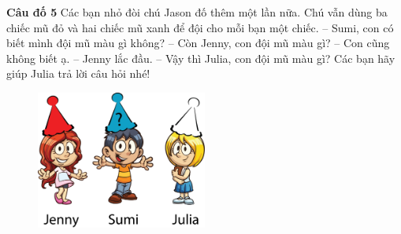 	\textbf{Câu đố 5}
	\vskip 0.1cm
	Các bạn nhỏ đòi chú Jason đố thêm một lần nữa. Chú vẫn dùng ba chiếc mũ đỏ và hai chiếc mũ xanh để đội cho mỗi bạn một chiếc.
	\vskip 0.1cm
	-- Sumi, con có biết mình đội mũ màu gì không?
	\vskip 0.1cm
	-- Còn Jenny, con đội mũ màu gì?
	\vskip 0.1cm
	-- Con cũng không biết ạ. -- Jenny lắc đầu.
	\vskip 0.1cm
	-- Vậy thì Julia, con đội mũ màu gì?
	\vskip 0.1cm
	Các bạn hãy giúp Julia trả lời câu hỏi nhé!
	\begin{figure}[H]
		\centering
		\vspace*{-5pt}
		\captionsetup{labelformat= empty, justification=centering}
		\includegraphics[width=0.5\textwidth]{h4}
		\vspace*{-10pt}
	\end{figure}